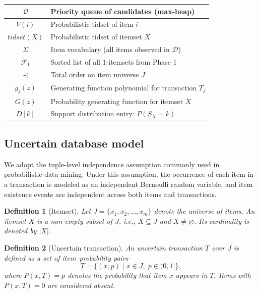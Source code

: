 \documentclass[10pt,letterpaper]{article}
\newtheorem{definition}{Definition}[section]
\newcounter{definition}
\begin{document}
\begin{table}[H]
\begin{tabular}{|c|l|}
\hline
$\mathcal{Q}$                  & Priority queue of candidates (max-heap) \\
\hline
$V(i)$                         & Probabilistic tidset of item $i$ \\
\hline
$\mathit{tidset}(X)$           & Probabilistic tidset of itemset $X$ \\
\hline
$\Sigma$                       & Item vocabulary (all items observed in $\mathcal{D}$) \\
\hline
$\mathcal{F}_1$                & Sorted list of all 1-itemsets from Phase 1 \\
\hline
$\prec$                        & Total order on item universe $J$ \\
\hline
$g_j(z)$                       & Generating function polynomial for transaction $T_j$ \\
\hline
$G(z)$                         & Probability generating function for itemset $X$ \\
\hline
$D[k]$                         & Support distribution entry: $P(S_X = k)$ \\
\hline
\end{tabular}
\end{table}

\subsection*{Uncertain database model}

We adopt the tuple-level independence assumption commonly used in probabilistic data mining. Under this assumption, the occurrence of each item in a transaction is modeled as an independent Bernoulli random variable, and item existence events are independent across both items and transactions.

\begin{definition} [Itemset]
\label{def:itemset}
Let $J=\{x_1,x_2,\ldots,x_m\}$ denote the universe of items. An itemset $X$ is a non-empty subset of $J$, i.e., $X \subseteq J$ and $X \neq \varnothing$. Its cardinality is denoted by $|X|$.
\end{definition}

\begin{definition}[Uncertain transaction]
\label{def:transaction}
An uncertain transaction $T$ over $J$ is defined as a set of item--probability pairs
\begin{equation}
T = \{(x,p) \mid x \in J,\; p \in (0,1]\},
\end{equation}
where $P(x,T)=p$ denotes the probability that item $x$ appears in $T$. Items with $P(x,T)=0$ are considered absent.
\end{definition}
\end{document}
